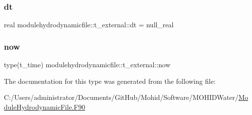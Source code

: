 \subsubsection{\texorpdfstring{dt}{dt}}
{\footnotesize\ttfamily real modulehydrodynamicfile\+::t\+\_\+external\+::dt = null\+\_\+real\hspace{0.3cm}{\ttfamily [private]}}

\mbox{\label{structmodulehydrodynamicfile_1_1t__external_a5847d0b50d15e90f0f2fd2b38112ab18}} 
\subsubsection{\texorpdfstring{now}{now}}
{\footnotesize\ttfamily type(t\+\_\+time) modulehydrodynamicfile\+::t\+\_\+external\+::now\hspace{0.3cm}{\ttfamily [private]}}



The documentation for this type was generated from the following file\+:\begin{DoxyCompactItemize}
\item 
C\+:/\+Users/administrator/\+Documents/\+Git\+Hub/\+Mohid/\+Software/\+M\+O\+H\+I\+D\+Water/\mbox{\hyperlink{_module_hydrodynamic_file_8_f90}{Module\+Hydrodynamic\+File.\+F90}}\end{DoxyCompactItemize}
